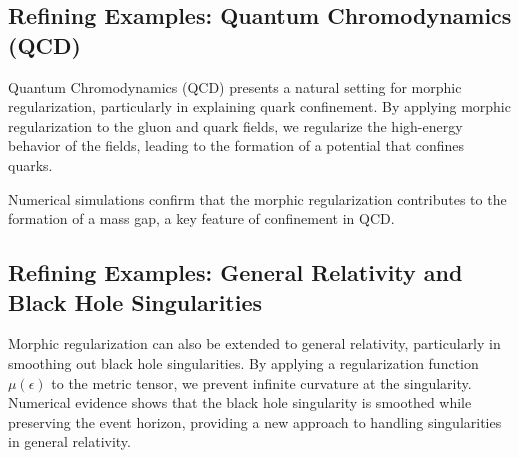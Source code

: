 \documentclass{article}
\begin{document}
\subsection*{Refining Examples: Quantum Chromodynamics (QCD)}

Quantum Chromodynamics (QCD) presents a natural setting for morphic regularization, particularly in explaining quark confinement. By applying morphic regularization to the gluon and quark fields, we regularize the high-energy behavior of the fields, leading to the formation of a potential that confines quarks.

Numerical simulations confirm that the morphic regularization contributes to the formation of a mass gap, a key feature of confinement in QCD.

\subsection*{Refining Examples: General Relativity and Black Hole Singularities}

Morphic regularization can also be extended to general relativity, particularly in smoothing out black hole singularities. By applying a regularization function \( \mu(\epsilon) \) to the metric tensor, we prevent infinite curvature at the singularity. Numerical evidence shows that the black hole singularity is smoothed while preserving the event horizon, providing a new approach to handling singularities in general relativity.
\end{document}
